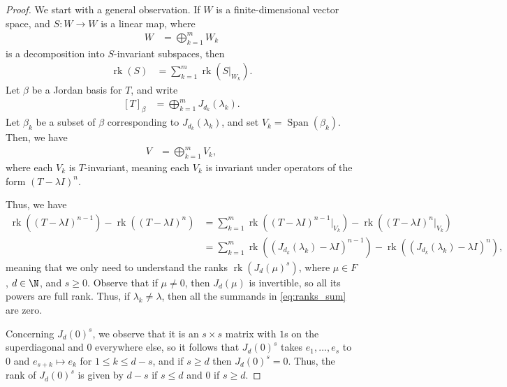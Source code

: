 \documentclass[10pt]{mypackage}
\begin{document}
\begin{proof}
  We start with a general observation. If $W$ is a finite-dimensional vector space, and $S\colon W\rightarrow W$ is a linear map, where
  \begin{align*}
    W &= \bigoplus_{k=1}^{m}W_k
  \end{align*}
  is a decomposition into $S$-invariant subspaces, then
  \begin{align*}
    \operatorname{rk}(S) &= \sum_{k=1}^{m} \operatorname{rk}\left( S|_{W_k} \right).
  \end{align*}
  Let $\beta$ be a Jordan basis for $T$, and write
  \begin{align*}
    \left[ T \right]_{\beta} &= \bigoplus_{k=1}^{m}J_{d_k}\left( \lambda_k \right).
  \end{align*}
  Let $\beta_k$ be a subset of $\beta$ corresponding to $J_{d_k}\left( \lambda_k \right)$, and set $V_k = \operatorname{Span}\left( \beta_k \right)$. Then, we have
  \begin{align*}
    V &= \bigoplus_{k=1}^{m}V_k,
  \end{align*}
  where each $V_k$ is $T$-invariant, meaning each $V_k$ is invariant under operators of the form $\left( T-\lambda I \right)^{n}$.

  Thus, we have
  \begin{align*}
    \operatorname{rk}\left( \left( T-\lambda I \right)^{n-1} \right)-\operatorname{rk}\left( \left( T-\lambda I \right)^{n} \right) &= \sum_{k=1}^{m}\operatorname{rk}\left( \left( T-\lambda I \right)^{n-1}|_{V_k} \right) - \operatorname{rk}\left( \left( T-\lambda I \right)^{n}|_{V_k} \right)\\
                                                                                                                                            &= \sum_{k=1}^{m} \operatorname{rk}\left( \left( J_{d_k}\left( \lambda_k \right) - \lambda I \right)^{n-1} \right) - \operatorname{rk}\left( \left( J_{d_k}\left( \lambda_k \right)-\lambda I \right)^{n} \right),\label{eq:ranks_sum}\tag{$\ast$}
  \end{align*}
  meaning that we only need to understand the ranks $\operatorname{rk}\left( J_{d}(\mu)^{s} \right)$, where $\mu\in F$, $d\in \N$, and $s\geq 0$. Observe that if $\mu\neq 0$, then $J_d(\mu)$ is invertible, so all its powers are full rank. Thus, if $\lambda_k\neq \lambda$, then all the summands in \eqref{eq:ranks_sum} are zero.

  Concerning $J_d(0)^{s}$, we observe that it is an $s\times s$ matrix with $1$s on the superdiagonal and $0$ everywhere else, so it follows that $J_d(0)^{s}$ takes $e_1,\dots,e_s$ to $0$ and $e_{s+k}\mapsto e_k$ for $1\leq k \leq d-s$, and if $s \geq d$ then $J_d(0)^{s} = 0$. Thus, the rank of $J_d(0)^{s}$ is given by $d-s$ if $s \leq d$ and $0$ if $s\geq d$.


\end{proof}
\end{document}
